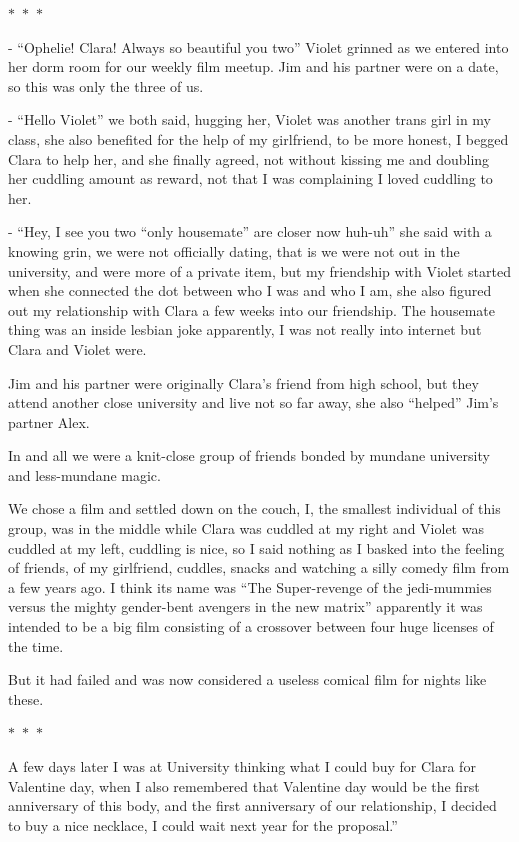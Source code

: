 \documentclass[hidelinks,12pt]{book}
\newcommand\sep{\begin{center}
  \boldmath $\ast$~$\ast$~$\ast$
\end{center}}
\begin{document}
\sep 


- “Ophelie! Clara! Always so beautiful you two” Violet grinned as we entered into her dorm room for our weekly film 
meetup. Jim and his partner were on a date, so this was only the three of us.\par 
\bigskip

- “Hello Violet” we both said, hugging her, Violet was another trans girl in my class, she also benefited for the help 
of my girlfriend, to be more honest, I begged Clara to help her, and she finally agreed, not without kissing me 
and doubling her cuddling amount as reward, not that I was complaining I loved cuddling to her.\par 
\bigskip

- “Hey, I see you two “only housemate” are closer now huh-uh” she said with a knowing grin, we were not officially 
dating, that is we were not out in the university, and were more of a private item, but my friendship with Violet 
started when she connected the dot between who I was and who I am, she also figured out my relationship with Clara 
a few weeks into our friendship. The housemate thing was an inside lesbian joke apparently, I was not really into 
internet but Clara and Violet were.\par 
\bigskip

Jim and his partner were originally Clara's friend from high school, but they attend another close university and live 
not so far away, she also “helped” Jim's partner Alex.\par
In and all we were a knit-close group of friends bonded by mundane university and less-mundane magic.\par 
\bigskip

We chose a film and settled down on the couch, I, the smallest individual of this group, was in the middle while Clara 
was cuddled at my right and Violet was cuddled at my left, cuddling is nice, so I said nothing as I basked into the 
feeling of friends, of my girlfriend, cuddles, snacks and watching a silly comedy film from a few years ago. I think 
its name was “The Super-revenge of the jedi-mummies versus the mighty gender-bent avengers in the new matrix” 
apparently it was intended to be a big film consisting of a crossover between four huge licenses of the time.\par 
\bigskip

But it had failed and was now considered a useless comical film for nights like these.
\sep
A few days later I was at University thinking what I could buy for Clara for Valentine day, when I also remembered that 
Valentine day would be the first anniversary of this body, and the first anniversary of our relationship, I decided 
to buy a nice necklace, I could wait next year for the proposal.”\par 
\bigskip
\end{document}
